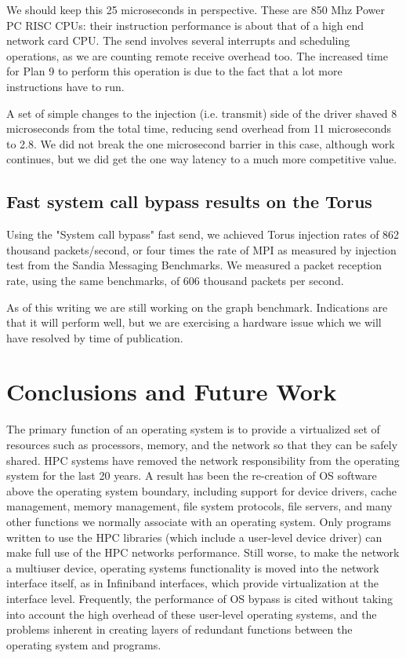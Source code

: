 \documentclass[letterpaper,twocolumn,10pt]{article}
\begin{document}
We should keep this 25 microseconds in perspective. These are 850 Mhz Power PC RISC CPUs: 
their instruction performance is about that of a high end network card CPU. The send involves several interrupts and scheduling operations, as we are counting remote receive overhead too. The increased time for Plan 9 
to perform this operation is due to the fact that a lot more instructions have to run. 

A set of simple changes to the injection (i.e. transmit) side of the driver shaved 8 microseconds from the total time, 
reducing send overhead from 11 microseconds to 2.8. We did not break the one microsecond barrier in this case, although work continues, but we did get the one way latency to a much more competitive value.

\subsection{Fast system call bypass results on the Torus}
Using the "System call bypass"  fast send, we achieved Torus injection rates of 862 thousand packets/second, or four times the rate of MPI as measured by injection test from the Sandia Messaging Benchmarks\cite{barrett2009application}. 
We measured a packet reception rate, using the same benchmarks, of 
606 thousand packets
per second. 

As of this writing we are still working on the graph benchmark. Indications are that it will perform well, but we are exercising a hardware issue which we will have resolved by time of publication. 

\section{Conclusions and Future Work}
The primary function of an operating system is to provide a virtualized set of resources such 
as processors, memory, and the network so that they can be safely shared. 
HPC systems have removed the network responsibility from the operating system for the 
last 20 years. A result has been  the re-creation of OS software above the operating system boundary, including support for device drivers, cache management, memory management, file system protocols, file servers, and many other functions we normally associate with an operating system. 
Only programs written to use the HPC libraries (which include a user-level device driver) 
can make full use of the HPC networks performance\cite{zhang2008design}. 
Still worse, to make the network a multiuser device, operating systems 
functionality is moved into the network interface itself, as in Infiniband interfaces, which provide virtualization at the interface level. 
Frequently, the performance of OS bypass is cited without taking into account the high overhead of these user-level operating systems, and the problems inherent in creating layers of redundant functions between the operating system and programs. 
\end{document}
